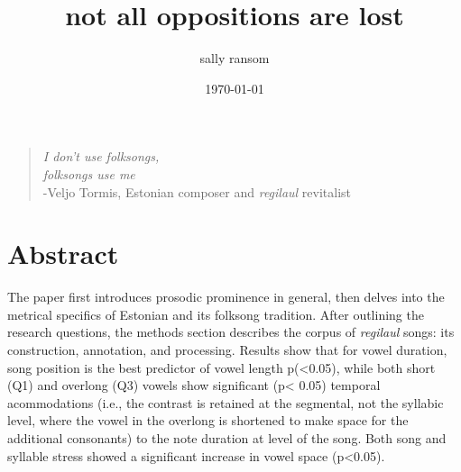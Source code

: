 \documentclass[12pt]{article}
\begin{document}
\title{not all oppositions are lost} 



\author[]{sally ransom}%
%


\vspace{-1em}



  \date{\today}


\begingroup
\let\center\flushleft
\let\endcenter\endflushleft
\maketitle
\endgroup


\bigskip
\begin{quote}\begin{center}
{\it I don't use folksongs, \\
folksongs use me}\\
-Veljo Tormis, Estonian composer and {\it regilaul} revitalist
\end{center}
\end{quote}


\titlepage





\sloppy







\section*{Abstract}

%
The paper first introduces prosodic prominence in general, then delves into the metrical specifics of Estonian and its folksong tradition. After outlining the research questions, the methods section describes the corpus of {\it regilaul} songs: its construction, annotation, and processing. Results show that for vowel duration, song position is the best predictor of vowel length p(<0.05), while both short (Q1) and overlong (Q3) vowels show significant (p< 0.05) temporal acommodations (i.e., the contrast is retained at the segmental, not the syllabic level, where the vowel in the overlong is shortened to make space for the additional consonants) to the note duration at level of the song. Both song and syllable stress showed a significant increase in vowel space (p<0.05).  
\end{document}
